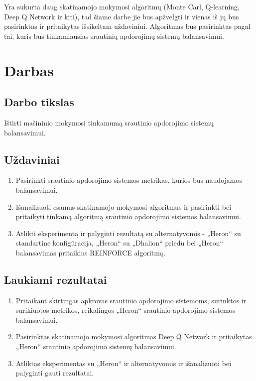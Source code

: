 \documentclass{VUMIFPSbakalaurinis}
\begin{document}
Yra sukurta daug skatinamojo mokymosi algoritmų (Monte Carl, Q-learning, Deep Q Network ir kiti), tad šiame darbe jie bus apžvelgti ir vienas iš jų bus pasirinktas ir pritaikytas išsikeltam uždaviniui. Algoritmas bus pasirinktas pagal tai, kuris bus tinkamiausias srautinių apdorojimų sistemų balansavimui.

\section{Darbas}

\subsection{Darbo tikslas}
Ištirti mašininio mokymosi tinkamumą srautinio apdorojimo sistemų balansavimui. 

\subsection{Uždaviniai}
\begin{enumerate}
    \item Pasirinkti srautinio apdorojimo sistemos metrikas, kurios bus naudojamos balansavimui.
    \item Išanalizuoti esamus skatinamojo mokymosi algoritmus ir pasirinkti bei pritaikyti tinkamą algoritmą srautinio apdorojimo sistemos balansavimui.
    \item Atlikti eksperimentą ir palyginti rezultatą su alternatyvomis - „Heron“ su standartine konfigūracija, „Heron“ su „Dhalion“ priedu bei „Heron“ balansavimas pritaikius REINFORCE algoritmą. 
\end{enumerate}

\subsection{Laukiami rezultatai}
\begin{enumerate}
    \item Pritaikant skirtingas apkrovas srautinio apdorojimo sistemoms, surinktos ir surikiuotos metrikos, reikalingos „Heron“ srautinio apdorojimo sistemos balansavimui. 
    \item Pasirinktas skatinamojo mokymosi algoritmas Deep Q Network ir pritaikytas „Heron“ srautinio apdorojimo sistemų balansavimui.
    \item Atliktas eksperimentas su „Heron“ ir alternatyvomis ir išanalizuoti bei palyginti gauti rezultatai.     
\end{enumerate}
 
\printbibliography[heading=bibintoc] 
\end{document}
